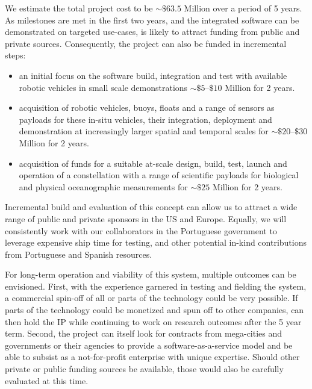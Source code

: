 \documentclass[12pt]{article}
\begin{document}
We estimate the total project cost to be $\sim \$63.5$ Million over a
period of 5 years. As milestones are met in the first two years, and
the integrated software can be demonstrated on targeted use-cases,
\pro is likely to attract funding from public and private
sources. Consequently, the project can also be funded in incremental
steps:

\begin{itemize}[noitemsep,topsep=0pt,parsep=0pt,partopsep=0pt]

\item an initial focus on the software build, integration and test
  with available robotic vehicles in small scale demonstrations $\sim
  \$5$--$\$10$ Million for 2 years.

\item acquisition of robotic vehicles, buoys, floats and a range of
  sensors as payloads for these in-situ vehicles, their integration,
  deployment and demonstration at increasingly larger spatial and
  temporal scales for $\sim \$20$--$\$30$ Million for 2 years.

\item acquisition of funds for a suitable at-scale design, build,
  test, launch and operation of a \sml constellation with a range of
  scientific payloads for biological and physical oceanographic
  measurements for $\sim \$25$ Million for 2 years.

\end{itemize}  

Incremental build and evaluation of this concept can allow us to
attract a wide range of public and private sponsors in the US and
Europe.  Equally, we will consistently work with our collaborators in
the Portuguese government to leverage expensive ship time for testing,
and other potential in-kind contributions from Portuguese and Spanish
resources.

For long-term operation and viability of this system, multiple
outcomes can be envisioned. First, with the experience garnered in
testing and fielding the system, a commercial spin-off of all or parts
of the technology could be very possible. If parts of the technology
could be monetized and spun off to other companies, \pro can then hold
the IP while continuing to work on research outcomes after the 5 year
term. Second, the project can itself look for contracts from
mega-cities and governments or their agencies to provide a
software-as-a-service model and be able to subsist as a not-for-profit
enterprise with unique expertise. Should other private or public
funding sources be available, those would also be carefully evaluated
at this time.
\end{document}
